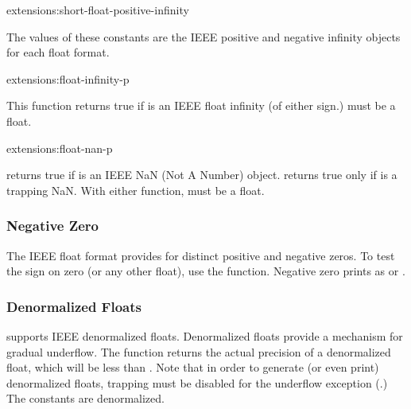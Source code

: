 \begin{defconst}{extensions:}{short-float-positive-infinity}
  
  The values of these constants are the IEEE positive and negative
  infinity objects for each float format.
\end{defconst}

\begin{defun}{extensions:}{float-infinity-p}{}
  
  This function returns true if  is an IEEE float infinity (of
  either sign.)   must be a float.
\end{defun}

\begin{defun}{extensions:}{float-nan-p}{}
  
   returns true if  is an IEEE NaN (Not A
  Number) object.   returns true only if
   is a trapping NaN.  With either function,  must be a
  float.
\end{defun}

\subsubsection{Negative Zero}

The IEEE float format provides for distinct positive and negative
zeros.  To test the sign on zero (or any other float), use the
\clisp{}  function.  Negative zero prints as
 or .

\subsubsection{Denormalized Floats}

\cmucl{} supports IEEE denormalized floats.  Denormalized floats
provide a mechanism for gradual underflow.  The \clisp{}
 function returns the actual precision of a
denormalized float, which will be less than .
Note that in order to generate (or even print) denormalized floats,
trapping must be disabled for the underflow exception
(.)  The \clisp{}
 constants are
denormalized.


